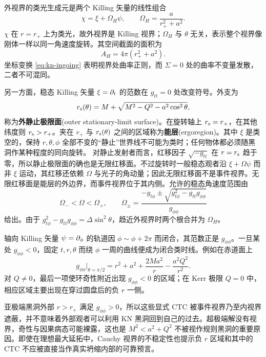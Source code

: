 外视界的类光生成元是两个 Killing 矢量的线性组合
\begin{equation}\label{eq:kn-generator}
    \chi=\xi+\Omega_H\psi,
    \qquad \Omega_H=\frac{a}{r_+^2+a^2}.
\end{equation}
$\chi$ 在 $r=r_+$ 上为类光，故外视界是 Killing 视界；$\Omega_H$ 与 $\theta$ 无关，表示整个视界像刚体一样以同一角速度旋转。其空间截面的面积为
\begin{equation}\label{eq:kn-area}
    A_H=4\pi(r_+^2+a^2).
\end{equation}
坐标变换 \eqref{eq:kn-ingoing} 表明视界处曲率正则，而 $\Sigma=0$ 处的曲率不变量发散，二者不可混同。

另一方面，稳态 Killing 矢量 $\xi=\partial_t$ 的范数在 $g_{tt}=0$ 处改变符号。外支为
\begin{equation}\label{eq:kn-static-limit}
    r_{\rm s}(\theta)=M+
       \sqrt{M^2-Q^2-a^2\cos^2\theta},
\end{equation}
称为\textbf{外静止极限面}(outer stationary-limit surface)。在旋转轴上 $r_{\rm s}=r_+$，在其他纬度则 $r_{\rm s}>r_+$。夹在 $r_+$ 与 $r_{\rm s}(\theta)$ 之间的区域称为\textbf{能层}(ergoregion)。其中 $\xi$ 是类空的，保持 $r,\theta,\phi$ 全部不变的“静止”世界线不可能为类时；任何物体都必须随黑洞作某种程度的同向旋转。
对静止发射者而言，红移因子 $\sqrt{-g_{tt}}$ 在 $r=r_{\rm s}$ 趋于零，所以静止极限面的确也是无限红移面。不过旋转时一般稳态观者沿 $\xi+\Omega\psi$ 而非 $\xi$ 运动，其红移还依赖 $\Omega$ 与光子的角动量；因此无限红移面不是事件视界。无限红移面是能层的外边界，而事件视界位于其内侧。允许的稳态角速度范围由
\begin{equation}\label{eq:kn-omega-range}
    \Omega_-<\Omega<\Omega_+,
    \qquad
    \Omega_\pm=\frac{-g_{t\phi}\pm
      \sqrt{g_{t\phi}^2-g_{tt}g_{\phi\phi}}}{g_{\phi\phi}}
\end{equation}
给出。由于 $g_{t\phi}^2-g_{tt}g_{\phi\phi}=\Delta\sin^2\theta$，趋近外视界时两个根合并为 $\Omega_H$。

轴向 Killing 矢量 $\psi=\partial_\phi$ 的轨道因 $\phi\sim\phi+2\pi$ 而闭合，其范数正是 $g_{\phi\phi}$。一旦某处 $g_{\phi\phi}<0$，固定 $t,r,\theta$ 而绕 $\phi$ 一周的曲线便成为闭合类时线。例如在赤道面上
\begin{equation}\label{eq:kn-ctc}
    g_{\phi\phi}\big|_{\theta=\pi/2}
      =r^2+a^2+\frac{2Ma^2}{r}-\frac{a^2Q^2}{r^2}.
\end{equation}
对 $Q\ne0$，最后一项使环奇性附近出现 $g_{\phi\phi}<0$ 的区域；在 Kerr 极限 $Q=0$ 中，相应区域主要出现在穿过圆盘后的负 $r$ 一侧。

亚极端黑洞外部 $r>r_+$ 满足 $g_{\phi\phi}>0$，所以这些显式 CTC 被事件视界乃至内视界遮蔽，并不意味着外部观者可以利用 KN 黑洞回到自己的过去。超极端解没有视界，奇性与因果病态可能裸露，这也是 $M^2<a^2+Q^2$ 不被视作规则黑洞的重要原因。即使在理想最大延拓中，Cauchy 视界的不稳定性也提示负 $r$ 区域和其中的 CTC 不应被直接当作真实坍缩内部的可靠预言。

